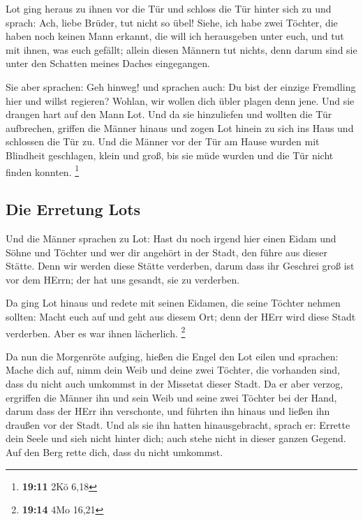  Lot ging heraus zu ihnen vor die Tür und schloss die Tür
hinter sich zu  und sprach: Ach, liebe Brüder, tut nicht
so übel!  Siehe, ich habe zwei Töchter, die haben noch
keinen Mann erkannt, die will ich herausgeben unter euch, und tut mit
ihnen, was euch gefällt; allein diesen Männern tut nichts, denn darum
sind sie unter den Schatten meines Daches eingegangen.

 Sie aber sprachen: Geh hinweg! und sprachen auch: Du bist
der einzige Fremdling hier und willst regieren? Wohlan, wir wollen dich
übler plagen denn jene. Und sie drangen hart auf den Mann Lot. Und da
sie hinzuliefen und wollten die Tür aufbrechen,  griffen
die Männer hinaus und zogen Lot hinein zu sich ins Haus und schlossen
die Tür zu.  Und die Männer vor der Tür am Hause wurden
mit Blindheit geschlagen, klein und groß, bis sie müde wurden und die
Tür nicht finden konnten. \footnote{\textbf{19:11} 2Kö 6,18}

\hypertarget{die-erretung-lots}{%
\subsection{Die Erretung Lots}\label{die-erretung-lots}}

 Und die Männer sprachen zu Lot: Hast du noch irgend hier
einen Eidam und Söhne und Töchter und wer dir angehört in der Stadt, den
führe aus dieser Stätte.  Denn wir werden diese Stätte
verderben, darum dass ihr Geschrei groß ist vor dem HErrn; der hat uns
gesandt, sie zu verderben.

 Da ging Lot hinaus und redete mit seinen Eidamen, die
seine Töchter nehmen sollten: Macht euch auf und geht aus diesem Ort;
denn der HErr wird diese Stadt verderben. Aber es war ihnen lächerlich.
\footnote{\textbf{19:14} 4Mo 16,21}

 Da nun die Morgenröte aufging, hießen die Engel den Lot
eilen und sprachen: Mache dich auf, nimm dein Weib und deine zwei
Töchter, die vorhanden sind, dass du nicht auch umkommst in der Missetat
dieser Stadt.  Da er aber verzog, ergriffen die Männer
ihn und sein Weib und seine zwei Töchter bei der Hand, darum dass der
HErr ihn verschonte, und führten ihn hinaus und ließen ihn draußen vor
der Stadt.  Und als sie ihn hatten hinausgebracht, sprach
er: Errette dein Seele und sieh nicht hinter dich; auch stehe nicht in
dieser ganzen Gegend. Auf den Berg rette dich, dass du nicht umkommst.

